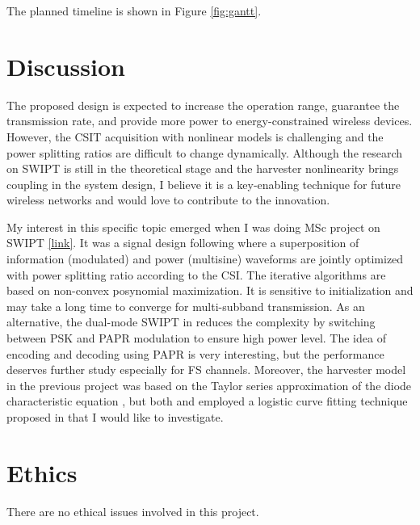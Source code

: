 \documentclass[conference]{IEEEtran}
\begin{document}
The planned timeline is shown in Figure \ref{fig:gantt}.

\section{Discussion}
The proposed design is expected to increase the operation range, guarantee the transmission rate, and provide more power to energy-constrained wireless devices. However, the CSIT acquisition with nonlinear models is challenging and the power splitting ratios are difficult to change dynamically. Although the research on SWIPT is still in the theoretical stage and the harvester nonlinearity brings coupling in the system design, I believe it is a key-enabling technique for future wireless networks and would love to contribute to the innovation.

My interest in this specific topic emerged when I was doing MSc project on SWIPT \href{https://github.com/SnowzTail/signal-optimization-for-wireless-information-and-power-transmission}{[link]}. It was a signal design following \cite{Clerckx2018} where a superposition of information (modulated) and power (multisine) waveforms are jointly optimized with power splitting ratio according to the CSI. The iterative algorithms are based on non-convex posynomial maximization. It is sensitive to initialization and may take a long time to converge for multi-subband transmission. As an alternative, the dual-mode SWIPT in \cite{Park2018} reduces the complexity by switching between PSK and PAPR modulation to ensure high power level. The idea of encoding and decoding using PAPR is very interesting, but the performance deserves further study especially for FS channels. Moreover, the harvester model in the previous project was based on the Taylor series approximation of the diode characteristic equation \cite{Clerckx2016}, but both \cite{Park2018} and \cite{Ma2019} employed a logistic curve fitting technique proposed in \cite{Boshkovska2015} that I would like to investigate.

\section{Ethics}
There are no ethical issues involved in this project.



\end{document}
